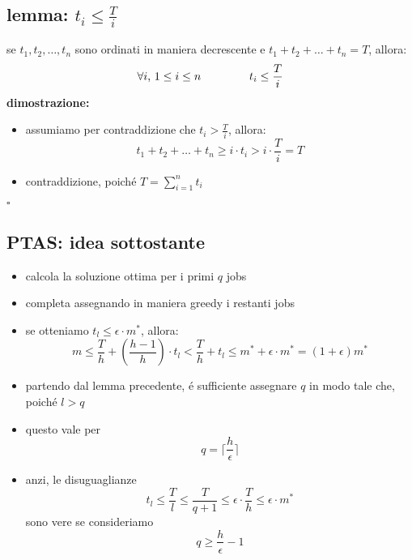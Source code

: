 \subsection*{lemma: $t_i\leq \frac{T}{i}$}
\begin{flushleft}
	se $t_1,t_2,\ldots,t_n$ sono ordinati in maniera decrescente e $t_1+t_2+\ldots+t_n=T$, allora:
		$$\forall i\text{, }1\leq i\leq n\hspace{1.5cm}t_i\leq \frac{T}{i}$$
	\textbf{dimostrazione:}
	\begin{itemize}
		\item assumiamo per contraddizione che $t_i>\frac{T}{i}$, allora:
			$$t_1+t_2+\ldots+t_n\geq i\cdot t_i>i\cdot\frac{T}{i}=T$$
		\item contraddizione, poich\'e $T=\sum_{i=1}^nt_i$
	\end{itemize}
	\hfill$\square$
\end{flushleft}


\subsection*{PTAS: idea sottostante}
\begin{flushleft}
	\begin{itemize}
		\item calcola la soluzione ottima per i primi $q$ jobs
		\item completa assegnando in maniera greedy i restanti jobs
		\item se otteniamo $t_l\leq\epsilon\cdot m^*$, allora:
			$$m\leq\frac{T}{h}+(\frac{h-1}{h})\cdot t_l<\frac{T}{h}+t_l\leq m^*+\epsilon\cdot m^*=(1+\epsilon)m^*$$
		\item partendo dal lemma precedente, \'e sufficiente assegnare $q$ in modo tale che, poich\'e $l>q$
		\item questo vale per
			$$q=\lceil\frac{h}{\epsilon}\rceil$$
		\item anzi, le disuguaglianze
			$$t_l\leq\frac{T}{l}\leq\frac{T}{q+1}\leq\epsilon\cdot\frac{T}{h}\leq\epsilon\cdot m^*$$
		sono vere se consideriamo
			$$q\geq\frac{h}{\epsilon}-1$$
	\end{itemize}
\end{flushleft}


